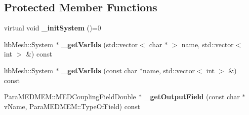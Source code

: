 \subsection*{Protected Member Functions}
\begin{DoxyCompactItemize}
\item 
\hypertarget{class___lib_mesh_problem_ad18da25656836fdeafa55fcec911cdc4}{virtual void {\bfseries \-\_\-init\-System} ()=0}\label{class___lib_mesh_problem_ad18da25656836fdeafa55fcec911cdc4}

\item 
\hypertarget{class___lib_mesh_problem_af4073a757108aa59b63182af50062e0b}{lib\-Mesh\-::\-System $\ast$ {\bfseries \-\_\-get\-Var\-Ids} (std\-::vector$<$ char $\ast$ $>$ name, std\-::vector$<$ int $>$ \&) const }\label{class___lib_mesh_problem_af4073a757108aa59b63182af50062e0b}

\item 
\hypertarget{class___lib_mesh_problem_aef5edc837a66d52055730d089d1a4689}{lib\-Mesh\-::\-System $\ast$ {\bfseries \-\_\-get\-Var\-Ids} (const char $\ast$name, std\-::vector$<$ int $>$ \&) const }\label{class___lib_mesh_problem_aef5edc837a66d52055730d089d1a4689}

\item 
\hypertarget{class___lib_mesh_problem_a24984c147004e33d7a00e9fe09d754d2}{Para\-M\-E\-D\-M\-E\-M\-::\-M\-E\-D\-Coupling\-Field\-Double $\ast$ {\bfseries \-\_\-get\-Output\-Field} (const char $\ast$v\-Name, Para\-M\-E\-D\-M\-E\-M\-::\-Type\-Of\-Field) const }\label{class___lib_mesh_problem_a24984c147004e33d7a00e9fe09d754d2}

\end{DoxyCompactItemize}
